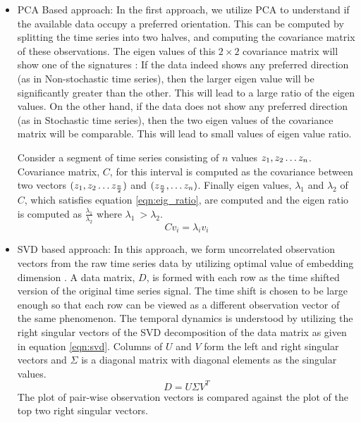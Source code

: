 \documentclass[10pt,conference]{IEEEtran}
\begin{document}
\begin{itemize}
  \item PCA Based approach: In the first approach, we utilize PCA to understand if the available data occupy a preferred orientation. This can be computed by splitting the time series into two halves, and computing the covariance matrix of these observations. The eigen values of this $2 \times 2$ covariance matrix will show one of the signatures : If the data indeed shows any preferred direction (as in Non-stochastic time series), then the larger eigen value will be significantly greater than the other. This will lead to a large ratio of the eigen values. On the other hand, if the data does not show any preferred direction (as in Stochastic time series), then the two eigen values of the covariance matrix will be comparable. This will lead to small values of eigen value ratio.


  Consider a segment of time series consisting of $n$ values  $z_1, z_2 \mathellipsis z_n$.  Covariance matrix, $C$, for this interval is computed as the covariance between two vectors $(z_1, z_2 \mathellipsis z_{\frac{n}{2}})$ and $(z_\frac{n}{2}, \mathellipsis z_n)$. Finally eigen values, $\lambda_1$ and $\lambda_2$ of $C$, which satisfies equation \ref{eqn:eig_ratio}, are computed and the eigen ratio is computed as  $\frac{\lambda_1}{\lambda_2}$ where $\lambda_1 \ > \lambda_2$.
  \begin{equation}
   Cv_i = \lambda_{i}v_i
    \label{eqn:eig_ratio}
  \end{equation}
  \item SVD based approach: In this approach, we form uncorrelated observation vectors from the raw time series data by utilizing optimal value of embedding dimension \cite{misra2006}. A data matrix, $D$, is formed with each row  as the  time shifted version of the original time series signal. The time shift is chosen to be large enough so that each row can be viewed as a different observation vector of the same phenomenon. The temporal dynamics is understood by utilizing the right singular vectors of the SVD decomposition of the data matrix as given in equation \ref{eqn:svd}. Columns of $U$ and $V$  form the left and right singular vectors and $\Sigma$ is a diagonal matrix with diagonal elements as the singular values.
\begin{equation}
  D = U \Sigma V^T
  \label{eqn:svd}
\end{equation}
   The plot of pair-wise observation vectors is compared against the plot of the top two right singular vectors.
\end{itemize}
\end{document}
